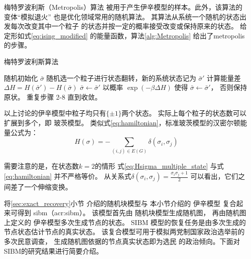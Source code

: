 
梅特罗波利斯（Metropolis）算法\cite{metropolis1953equation}
被用于产生伊辛模型的样本。此外，该算法的变体“模拟退火”
\cite{pincus1970monte} 也是优化领域常用的随机算法。
其算法从系统一个随机的状态出发每次改变其中一个粒子
的状态并按一定的概率接受改变或保持原来的状态。
给定形如式\eqref{eq:ising_modified}
的能量函数，算法\ref{alg:Metropolis}
给出了\gls{metropolis}的步骤。

\begin{algorithm}
  \caption{梅特罗波利斯算法}\label{alg:Metropolis}
  \begin{algorithmic}[1]
    \STATE 随机初始化 $\bar{\sigma}$
    \STATE 随机选一个粒子进行状态翻转，新的系统状态记为 $\bar{\sigma}'$ 
    \STATE 计算能量差 $\Delta H= H(\bar{\sigma}') - H(\bar{\sigma})$
    \STATE $\bar{\sigma} \leftarrow \bar{\sigma}'$
    \ELSE
    \STATE 以概率 $\exp(-\beta \Delta H)$ 
    使得 $\bar{\sigma} \leftarrow \bar{\sigma}'$，
    否则保持原状。 
    \ENDIF
    \STATE 重复步骤 2-8 直到收敛。
\end{algorithmic}  
\end{algorithm}

以上讨论的伊辛模型中粒子均只有$\{\pm 1\}$两个状态。
实际上每个粒子的状态数可以扩展到多个，即 玻茨模型\cite{potts1952some}。
类似式\eqref{eq:hamiltonian}，标准玻茨模型的汉密尔顿能量公式为：
\begin{equation}\label{eq:Hsigma_multiple_state}
  H(\sigma) = -\sum_{(i,j) \in E(G)}\delta(\sigma_i, \sigma_j)
\end{equation}
\begin{remark}\label{rem:equivalence_H_energy}
需要注意的是，在状态数$k=2$的情形
式\eqref{eq:Hsigma_multiple_state} 
与式\eqref{eq:hamiltonian}
并不严格等价。
从关系式$\delta(\sigma_i, \sigma_j) = \frac{\sigma_i \sigma_j + 1}{2}$
可以看出，它们之间差了一个伸缩变换。
\end{remark}

将\ref{sec:exact_recovery}小节 介绍的随机块模型与 本小节介绍的 伊辛模型
复合起来可得到 \gls{sibm}（\gls{acr:sibm}）\cite{ye2020exact}。
该模型首先由 随机块模型生成随机图，
再由随机图上定义的 伊辛模型多次生成节点的状态。
SIBM 模型的恢复任务是由多次生成的节点状态估计节点的真实状态。
该复合模型可用于模拟两党制国家政治选举前的多次民意调查，
生成随机图依据的节点真实状态即为选民
的政治倾向。下面对SIBM的研究结果进行简要介绍。

